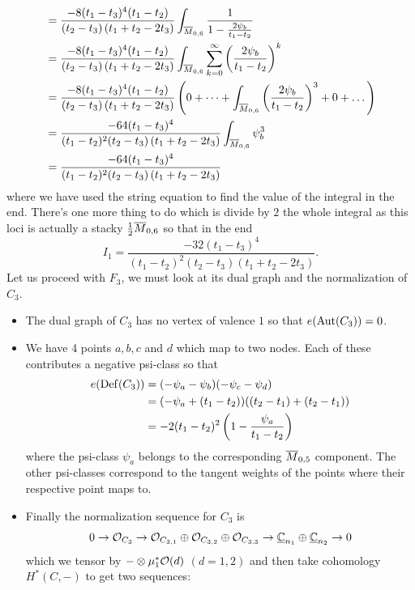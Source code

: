 \documentclass[12pt]{memoir}
\begin{document}
\begin{Ex}
\begin{align*}
        &=\frac{-8(t_1-t_3)^4(t_1-t_2)}{(t_2-t_3)\left(t_1+t_2-2t_3\right)}\int_{\overline M_{0,6}}\frac{1}{1-\frac{2\psi_b}{t_1-t_2}}\\
        &=\frac{-8(t_1-t_3)^4(t_1-t_2)}{(t_2-t_3)\left(t_1+t_2-2t_3\right)}\int_{\overline M_{0,6}}\sum_{k=0}^{\infty}\left(\frac{2\psi_b}{t_1-t_2}\right)^k\\
        &=\frac{-8(t_1-t_3)^4(t_1-t_2)}{(t_2-t_3)\left(t_1+t_2-2t_3\right)}\left(0+\dots+\int_{\overline M_{0,6}}\left(\frac{2\psi_b}{t_1-t_2}\right)^3+0+\dots\right)\\
        &=\frac{-64(t_1-t_3)^4}{(t_1-t_2)^2(t_2-t_3)\left(t_1+t_2-2t_3\right)}\int_{\overline M_{0,6}}\psi_b^3\\
        &=\frac{-64(t_1-t_3)^4}{(t_1-t_2)^2(t_2-t_3)\left(t_1+t_2-2t_3\right)}
    \end{align*}
    where we have used the string equation to find the value of the integral in the end. There's one more thing to do which is divide by $2$ the whole integral as this loci is actually a stacky $\half\ov{M}_{0,6}$ so that in the end
    $$I_1=\frac{-32(t_1-t_3)^4}{(t_1-t_2)^2(t_2-t_3)\left(t_1+t_2-2t_3\right)}.$$
    Let us proceed with $F_3$, we must look at its dual graph and the normalization of $C_3$. \par
    \begin{itemize}
        \item The dual graph of $C_3$ has no vertex of valence $1$ so that $e(\operatorname{Aut}(C_3))=0$.
        \item We have 4 points $a,b,c$ and $d$ which map to two nodes. Each of these contributes a negative psi-class so that 
        \begin{align*}
            e(\operatorname{Def}(C_3))&=(-\psi_a-\psi_b)(-\psi_c-\psi_d)\\
            &=(-\psi_a+(t_1-t_2))((t_2-t_1)+(t_2-t_1))\\
            &=-2(t_1-t_2)^2\left(1-\frac{\psi_a}{t_1-t_2}\right)
        \end{align*}
        where the psi-class $\psi_a$ belongs to the corresponding $\overline{M}_{0,5}$ component. The other psi-classes correspond to the tangent weights of the points where their respective point maps to.
        \item Finally the normalization sequence for $C_3$ is 
        $$0\to\mathcal{O}_{C_3}\to\mathcal{O}_{C_{3,1}}\oplus\mathcal{O}_{C_{3,2}}\oplus\mathcal{O}_{C_{3,3}}\to\underline{\mathbb{C}}_{n_1}\oplus\underline{\mathbb{C}}_{n_2}\to 0$$
        which we tensor by $-\otimes \mu_1^\ast\mathcal{O}(d)$ $(d=1,2)$ and then take cohomology $H^\ast(C,-)$ to get two sequences:

\end{itemize}
\end{Ex}
\end{document}
